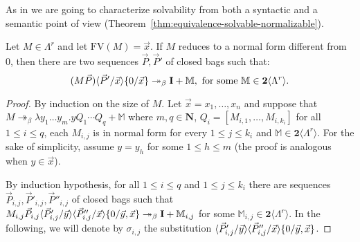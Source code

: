 \documentclass{LMCS}
\newcommand{\nat}{\mathbf{N}}
\newcommand{\bool}{\mathbf{2}}
\newcommand{\lam}{\ensuremath{\lambda}}
\newcommand{\FV}{\mathrm{FV}}
\newcommand{\Set}[1]{\Lambda^{#1}}
\newcommand{\sums}[1]{\bool\langle\Set{#1}\rangle}
\newcommand{\msto}{\twoheadrightarrow}
\newcommand{\subst}[2]{\{ #2 / #1 \}}	\newcommand{\dg}[2]{\mathrm{deg}_{#1}(#2)} \newcommand{\obsle}{\sqsubseteq_{\mathcal{O}}}
\newcommand{\seq}[1]{\vec{#1}}
\newcommand{\sM}{\mathbb{M}}
\newcommand{\gb}{\beta}
\begin{document}
As in \cite{PaganiR11,PaganiR10} we are going to characterize solvability from both a syntactic and a semantic point of view (Theorem~\ref{thm:equivalence-solvable-normalizable}).

\begin{prop}\label{prop:solvability}
Let $M\in\Set{r}$ and let $ \FV(M) = \seq x$.
If $M$ reduces to a normal form different from 0, then there are two sequences $\seq P, \seq P'$ of closed bags such that:
$$ (M\seq P)\lsubst{\seq x}{\seq P'}\subst{\seq x}{0}\msto_\beta \bold{I} + \sM,\textrm{ for some }\sM\in\sums{r}. $$
\end{prop}

\begin{proof}
By induction on the size of $M$.
Let $\seq x = x_1,\ldots,x_n$ and suppose that $M\msto_\gb \lam y_1\dots y_m.y Q_1\cdots Q_q + \sM$ where 
$m,q\in\nat$, 
$Q_i = [M_{i,1},\dots, M_{i,k_i}]$ for all $1\le i \le q$, 
each $M_{i,j}$ is in normal form for every $1\le j\le k_i$ and $\sM\in\sums{r}$.
For the sake of simplicity, assume $y = y_h$ for some $1\le h\le m$ (the proof is analogous when $y\in\seq x$).

By induction hypothesis, for all  $1\le i \le q$  and $1\le j \le k_i$
 there are sequences $\seq P_{i,j},\seq P'_{i,j},\seq P''_{i,j}$ of closed bags such that $M_{i,j}\seq P_{i,j}\lsubst{\seq y}{\seq P'_{i,j}}\lsubst{\seq x}{\seq P''_{i,j}}\subst{\seq y,\seq x}{0}\msto_\gb \bold{I} + \sM_{i,j}$ for some $\sM_{i,j}\in\sums{r}$.
In the following, we will denote by $\sigma_{i,j}$ the substitution $\lsubst{\seq y}{\seq P'_{i,j}}\lsubst{\seq x}{\seq P''_{i,j}}\subst{\seq y,\seq x}{0}$.


\end{proof}
\end{document}
